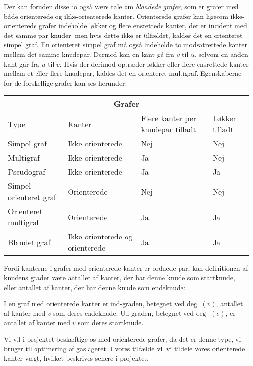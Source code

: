 

Der kan foruden disse to også være tale om \emph{blandede grafer}, som er grafer med både orienterede og ikke-orienterede kanter. Orienterede grafer kan ligesom ikke-orienterede grafer indeholde løkker og flere ensrettede kanter, der er incident med det samme par knuder, men hvis dette ikke er tilfældet, kaldes det en orienteret simpel graf. En orienteret simpel graf må også indeholde to modsatrettede kanter mellem det samme knudepar. Dermed kan en kant gå fra $v$ til $u$, selvom en anden kant går fra $u$ til $v$. Hvis der derimod optræder løkker eller flere ensrettede kanter mellem et eller flere knudepar, kaldes det en orienteret multigraf.  
Egenskaberne for de forskellige grafer kan ses herunder:


\begin{center}
\begin{tabular}{ |p{4cm}|p{3cm}|p{3cm}|p{2cm}|  }
 \hline
 \multicolumn{4}{|c|}{Grafer} \\
 \hline
 Type & Kanter & Flere kanter per knudepar tilladt & Løkker tilladt\\
 \hline
 Simpel graf   & Ikke-orienterede    & Nej &   Nej\\
 Multigraf &   Ikke-orienterede & Ja   & Nej\\
 Pseudograf & Ikke-orienterede & Ja &  Ja\\
 Simpel orienteret graf    & Orienterede & Nej &  Nej\\
 Orienteret multigraf &  Orienterede  & Ja & Ja\\
 Blandet graf & Ikke-orienterede og orienterede  & Ja   & Ja\\
 \hline
\end{tabular}
\end{center}

Fordi kanterne i grafer med orienterede kanter er ordnede par, kan definitionen af knudens grader være antallet af kanter, der har denne knude som startknude, eller antallet af kanter, der har denne knude som endeknude:
\begin{defn}
I en graf med orienterede kanter er ind-graden, betegnet ved $\mathrm{deg}^{-}(v)$, antallet af kanter med $v$ som deres endeknude. Ud-graden, betegnet ved $\mathrm{deg}^{+}(v)$, er antallet af kanter med $v$ som deres startknude.
\end{defn}
Vi vil i projektet beskæftige os med orienterede grafer, da det er denne type, vi bruger til optimering af gaslageret. I vores tilfælde vil vi tildele vores orienterede kanter vægt, hvilket beskrives senere i projektet.
